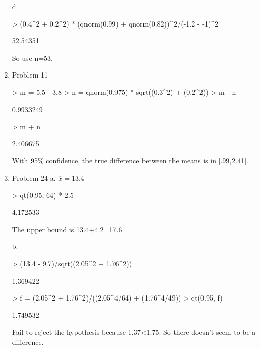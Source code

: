 \documentclass[11pt,letterpaper]{article}
\begin{document}
\begin{enumerate}
d.
\begin{Schunk}
\begin{Sinput}
> (0.4^2 + 0.2^2) * (qnorm(0.99) + qnorm(0.82))^2/(-1.2 - -1)^2
\end{Sinput}
\begin{Soutput}
[1] 52.54351
\end{Soutput}
\end{Schunk}
So use n=53.

\item Problem 11
\begin{Schunk}
\begin{Sinput}
> m = 5.5 - 3.8
> n = qnorm(0.975) * sqrt((0.3^2) + (0.2^2))
> m - n
\end{Sinput}
\begin{Soutput}
[1] 0.9933249
\end{Soutput}
\begin{Sinput}
> m + n
\end{Sinput}
\begin{Soutput}
[1] 2.406675
\end{Soutput}
\end{Schunk}
With 95\% confidence, the true difference between the means is in [.99,2.41].

\item Problem 24
a.
$\overline{x}=13.4$
\begin{Schunk}
\begin{Sinput}
> qt(0.95, 64) * 2.5
\end{Sinput}
\begin{Soutput}
[1] 4.172533
\end{Soutput}
\end{Schunk}
The upper bound is 13.4+4.2=17.6

b.
\begin{Schunk}
\begin{Sinput}
> (13.4 - 9.7)/sqrt((2.05^2 + 1.76^2))
\end{Sinput}
\begin{Soutput}
[1] 1.369422
\end{Soutput}
\begin{Sinput}
> f = (2.05^2 + 1.76^2)/((2.05^4/64) + (1.76^4/49))
> qt(0.95, f)
\end{Sinput}
\begin{Soutput}
[1] 1.749532
\end{Soutput}
\end{Schunk}
Fail to reject the hypothesis because 1.37<1.75. So there doesn't seem to be a difference.\\


\end{enumerate}
\end{document}
